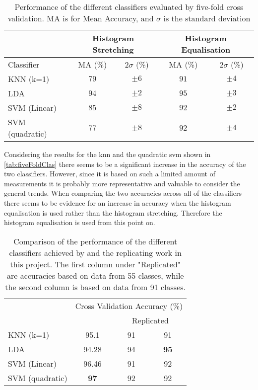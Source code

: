 \begin{table}[H]
\centering
\begin{tabular}{|l|c|c|c|c|}
\cline{2-5}
\multicolumn{1}{c|}{}&\multicolumn{2}{c|}{Histogram Stretching}&\multicolumn{2}{c|}{Histogram Equalisation}\\
\hline
Classifier&MA (\%)&$2\sigma$ (\%)&MA (\%)&$2\sigma$ (\%)\\
\hline
KNN (k=1)&$79$&$\pm 6$&$91$&$\pm4$\\
\hline
LDA&$94$&$\pm2$&$95$&$\pm3$\\
\hline
SVM (Linear)&$85$&$\pm8$&$92$&$\pm2$\\
\hline
SVM (quadratic)&$77$&$\pm8$&$92$&$\pm4$\\
\hline
\end{tabular}
\caption{Performance of the different classifiers evaluated by five-fold cross validation. MA is for Mean Accuracy, and $\sigma$ is the standard deviation}
\label{tab:fiveFoldClas}
\end{table} 
Considering the results for the \gls{knn} and the quadratic \gls{svm} shown in \autoref{tab:fiveFoldClas} there seems to be a significant increase in the accuracy of the two classifiers. However, since it is based on such a limited amount of measurements it is probably more representative and valuable to consider the general trends. When comparing the two accuracies across all of the classifiers there seems to be evidence for an increase in accuracy when the histogram equalisation is used rather than the histogram stretching. Therefore the histogram equalisation is used from this point on. 
\begin{table}[H]
\centering
\begin{tabular}{|l|c|c|c|}
\cline{2-4}
\multicolumn{1}{c|}{}&\multicolumn{3}{c|}{Cross Validation Accuracy (\%)}\\
\cline{2-4}
\multicolumn{1}{c|}{}&\cite{Khan2017a}&\multicolumn{2}{c|}{Replicated}\\
\hline
KNN (k=1)&95.1&91&91\\
\hline
LDA&94.28&94&\textbf{95}\\
\hline
SVM (Linear)&96.46&91&92\\
\hline
SVM (quadratic)&\textbf{97}&92&92\\
\hline
\end{tabular}
\caption{Comparison of the performance of the different classifiers achieved by \cite{Khan2017a} and the replicating work in this project. The first column under "Replicated" are accuracies based on data from 55 classes, while the second column is based on data from 91 classes.}
\label{tab:fiveFoldClasCompare}
\end{table} 

